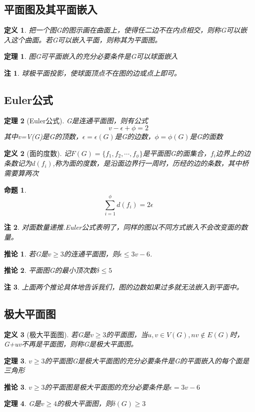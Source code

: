 \documentclass[UTF8]{ctexart}
\newtheorem{dfnt}{定义}
\newtheorem{thr}{定理}
\newtheorem*{coro}{推论}
\newtheorem*{note}{注}
\newtheorem{pro}{命题}
\begin{document}
\subsection{平面图及其平面嵌入}
\begin{dfnt}
把一个图G的图示画在曲面上，使得任二边不在内点相交，则称G可以嵌入这个曲面。若G可以嵌入平面，则称其为平面图。
\end{dfnt}
\begin{thr}
图G可平面嵌入的充分必要条件是G可以球面嵌入
\end{thr}
\begin{note}
球极平面投影，使球面顶点不在图的边或点上即可。
\end{note}
\subsection{Euler公式}
\begin{thr}[Euler公式]
G是连通平面图，则有公式$$v-\epsilon+\phi = 2$$其中v=V(G)是G的顶数，$\epsilon =\epsilon (G)$是G的边数，$\phi = \phi (G)$是G的面数
\end{thr}
\begin{dfnt}[面的度数]
记$F(G)=\{f_1,f_2,\cdots,f_{\phi}\}$是平面图G的面集合，$f_i$边界上的边条数记为$d(f_i)$,称为面的度数，是沿面边界行一周时，历经的边的条数，其中桥需要算两次
\end{dfnt}
\begin{pro}
$$\sum_{i=1}^{\phi}d(f_i)=2\epsilon$$
\end{pro}
\begin{note}
对面数量递推.Euler公式表明了，同样的图以不同方式嵌入不会改变面的数量。
\end{note}
\begin{coro}
若G是$v \geq 3$的连通平面图，则$\epsilon \leq 3v-6$.
\end{coro}
\begin{coro}
平面图G的最小顶次数$\delta \leq 5$
\end{coro}
\begin{note}
上面两个推论具体地告诉我们，图的边数如果过多就无法嵌入到平面中。
\end{note}
\subsection{极大平面图}
\begin{dfnt}[极大平面图]
若G是$v \geq 3$的平面图，当$u,v \in V(G),nv \notin E(G)$时，G+uv不再是平面图，则称G是极大平面图。
\end{dfnt}
\begin{thr}
$v \geq 3$的平面图G是极大平面图的充分必要条件是G的平面嵌入的每个面是三角形
\end{thr}
\begin{coro}
$v \geq 3$的平面图是极大平面图的充分必要条件是$\epsilon = 3v-6$
\end{coro}
\begin{thr}
G是$v \geq 4$的极大平面图，则$\delta (G) \geq 3$
\end{thr}
\end{document}
